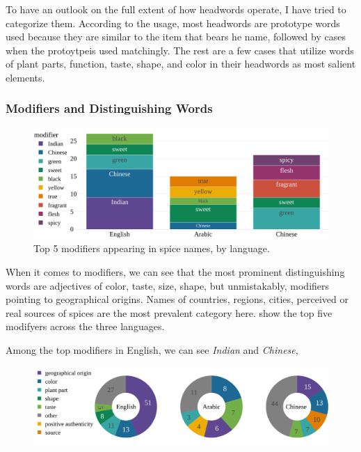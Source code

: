 To have an outlook on the full extent of how headwords operate, I have tried to categorize them. According to the usage, most headwords are prototype words used because they are similar to the item that bears he name, followed by cases when the protoytpeis used matchingly. The rest are a few cases that utilize words of plant parts, function, taste, shape, and color in their headwords as most salient elements.




\subsubsection{Modifiers and Distinguishing Words}

\begin{figure}[ht!]
  \includegraphics[width=\linewidth]{imgs/plots/modifier_bar.pdf}
  \caption{Top 5 modifiers appearing in spice names, by language.}
  \label{fig:modifier_bar}
\end{figure}

When it comes to modifiers, we can see that the most prominent distinguishing words are adjectives of color, taste, size, shape, but unmistakably, modifiers pointing to geographical origins. Names of countries, regions, cities, perceived or real sources of spices are the most prevalent category here.  show the top five modifyers across the three languages. 

Among the top modifiers in English, we can see \textit{Indian} and \textit{Chinese}, 



\begin{figure}[ht!]
  \includegraphics[width=\linewidth]{imgs/plots/modifier_type_tripie.pdf}
  \caption{}
  \label{fig:modifier_type_tripie}
\end{figure}


